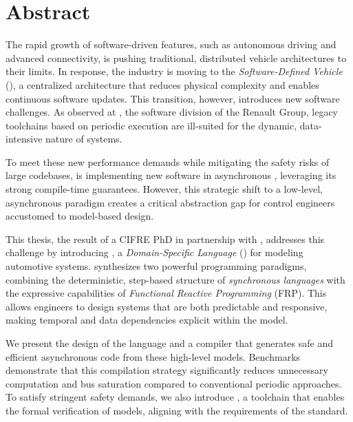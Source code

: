 \documentclass[12pt]{report}
\title{\manuscriptTitle}
\author{Émilie THOMÉ}
\date{2025}
\begin{document}






\chapter*{Abstract}

The rapid growth of software-driven features, such as autonomous driving and advanced connectivity,
is pushing traditional, distributed vehicle architectures to their limits. In response, the industry
is moving to the \emph{Software-Defined Vehicle} (\sdv), a centralized architecture that reduces
physical complexity and enables continuous software updates.
%
This transition, however, introduces new software challenges. As observed at \ampere, the software
division of the Renault Group, legacy toolchains based on periodic execution are ill-suited for the
dynamic, data-intensive nature of \sdv systems.

To meet these new performance demands while mitigating the safety risks of large \Ci codebases,
\ampere is implementing new software in asynchronous \Rust, leveraging its strong compile-time
guarantees. However, this strategic shift to a low-level, asynchronous paradigm creates a critical
abstraction gap for control engineers accustomed to model-based design.

This thesis, the result of a CIFRE PhD in partnership with \ampere, addresses this challenge by
introducing \GRust, a \emph{Domain-Specific Language} (\dsl) for modeling automotive systems. \GRust
synthesizes two powerful programming paradigms, combining the deterministic, step-based structure of
\emph{synchronous languages} with the expressive capabilities of \emph{Functional Reactive
    Programming} (FRP). This allows engineers to design systems that are both predictable and
responsive, making temporal and data dependencies explicit within the model.

We present the design of the \GRust language and a compiler that generates safe and efficient
asynchronous \Rust code from these high-level models. Benchmarks demonstrate that this compilation
strategy significantly reduces unnecessary computation and bus saturation compared to conventional
periodic approaches. To satisfy stringent safety demands, we also introduce \GReusot, a toolchain
that enables the formal verification of \GRust models, aligning with the requirements of the \iso
standard.
\end{document}
